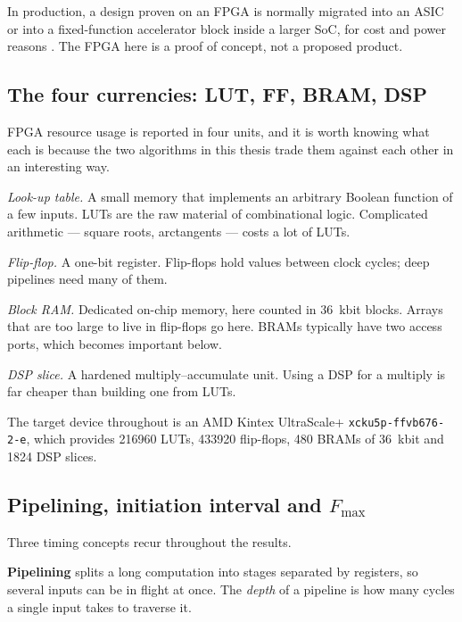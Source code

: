 In production, a design proven on an FPGA is normally migrated into an ASIC or
into a fixed-function accelerator block inside a larger SoC, for cost and power
reasons \cite{kuon2008,nxp_an5375}. The FPGA here is a proof of concept, not a
proposed product.

\subsection{The four currencies: LUT, FF, BRAM, DSP}

FPGA resource usage is reported in four units, and it is worth knowing what
each is because the two algorithms in this thesis trade them against each other
in an interesting way.

\begin{description}[leftmargin=!,labelwidth=24mm,style=nextline,font=\normalfont\bfseries]
\item[LUT] \emph{Look-up table.} A small memory that implements an arbitrary
Boolean function of a few inputs. LUTs are the raw material of combinational
logic. Complicated arithmetic --- square roots, arctangents --- costs a lot of
LUTs.
\item[FF] \emph{Flip-flop.} A one-bit register. Flip-flops hold values between
clock cycles; deep pipelines need many of them.
\item[BRAM] \emph{Block RAM.} Dedicated on-chip memory, here counted in
\SI{36}{\kilo bit} blocks. Arrays that are too large to live in flip-flops go
here. BRAMs typically have two access ports, which becomes important below.
\item[DSP] \emph{DSP slice.} A hardened multiply--accumulate unit. Using a DSP
for a multiply is far cheaper than building one from LUTs.
\end{description}

The target device throughout is an AMD Kintex UltraScale+
\texttt{xcku5p-ffvb676-2-e}, which provides \num{216960} LUTs,
\num{433920} flip-flops, 480 BRAMs of \SI{36}{\kilo bit} and \num{1824} DSP
slices.

\subsection{Pipelining, initiation interval and $F_{\max}$}
\label{sec:pipelining}

Three timing concepts recur throughout the results.

\textbf{Pipelining} splits a long computation into stages separated by
registers, so several inputs can be in flight at once. The \emph{depth} of a
pipeline is how many cycles a single input takes to traverse it.

